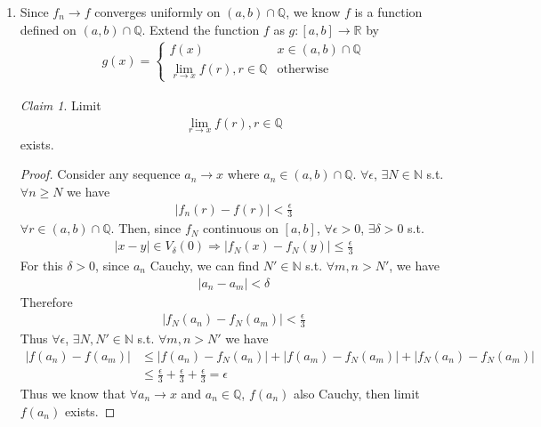 \documentclass[twoside,11pt]{article}
\newcommand{\R}{\mathbb{R}}
\newcommand{\N}{\mathbb{N}}
\newcommand{\Q}{\mathbb{Q}}
\theoremstyle{definition}
\theoremstyle{remark}
\newtheorem*{claim}{Claim}
\begin{document}
\begin{enumerate}
\item Since $f_n\rightarrow f$ converges uniformly on $(a,b)\cap\Q$, 
we know $f$ is a function defined on $(a,b)\cap\Q$.
Extend the function $f$ as $g:[a, b]\rightarrow\R$ by
\begin{align*}
    g(x) = \begin{cases}
        f(x) & x\in(a,b)\cap \Q\\
        \lim_{r\rightarrow x}f(r), r\in\Q & \text{otherwise}
    \end{cases}
\end{align*}
\begin{claim}
    Limit 
    \begin{align*}
        \lim_{r\rightarrow x}f(r), r\in\Q
    \end{align*}
    exists.
\end{claim}
\begin{proof}
    Consider any sequence $a_n\rightarrow x$ where $a_n\in(a,b)\cap\Q$.
    $\forall\epsilon$, $\exists N\in\N$ s.t. $\forall n\geq N$ we have
    \begin{align*}
        |f_n(r) - f(r)|<\frac{\epsilon}{3}
    \end{align*}
    $\forall r\in(a, b)\cap\Q$.
    Then, since $f_N$ continuous on $[a,b]$, $\forall\epsilon>0$,
    $\exists\delta>0$ s.t.
    \begin{align*}
        |x-y|\in V_\delta(0)\Rightarrow
        |f_N(x)-f_N(y)|\leq\frac{\epsilon}{3}
    \end{align*}
    For this $\delta>0$, since $a_n$ Cauchy, we can find $N'\in\N$
    s.t. $\forall m,n>N'$, we have
    \begin{align*}
        |a_n-a_m|<\delta
    \end{align*}
    Therefore
    \begin{align*}
        |f_N(a_n) - f_N(a_m)|<\frac{\epsilon}{3}
    \end{align*}
    Thus $\forall\epsilon$, $\exists N,N'\in\N$ s.t.
    $\forall m,n>N'$ we have
    \begin{align*}
        |f(a_n)-f(a_m)| &\leq
        |f(a_n)-f_N(a_n)| + |f(a_m)-f_N(a_m)| + |f_N(a_n)-f_N(a_m)|\\
        &\leq \frac{\epsilon}{3} + \frac{\epsilon}{3} + \frac{\epsilon}{3} = \epsilon
    \end{align*}
    Thus we know that $\forall a_n\rightarrow x$ and $a_n\in\Q$, $f(a_n)$
    also Cauchy, then limit $f(a_n)$ exists.


\end{proof}
\end{enumerate}
\end{document}
